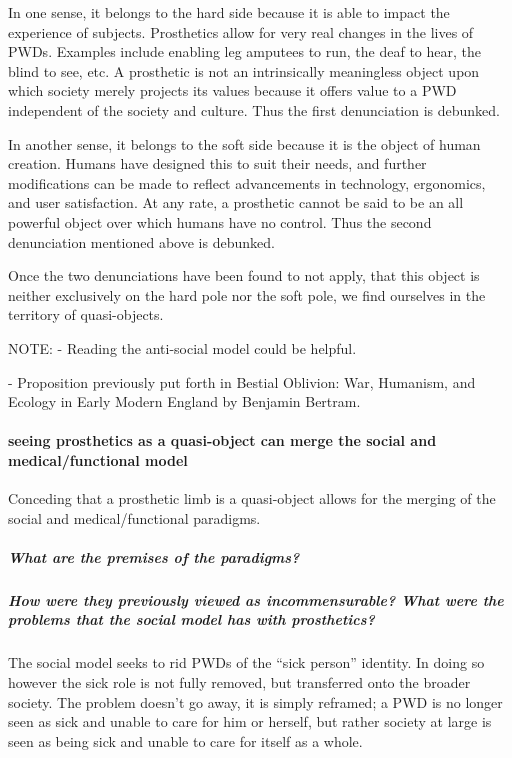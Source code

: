 \documentclass{lps}
\begin{document}
In one sense, it belongs to the hard side because it is able to impact the
experience of subjects. Prosthetics allow for very real changes in the lives
of PWDs. Examples include enabling leg amputees to run, the deaf to hear, the
blind to see, etc. A prosthetic is not an intrinsically meaningless object
upon which society merely projects its values because it offers value to a PWD
independent of the society and culture. Thus the first denunciation is
debunked.

In another sense, it belongs to the soft side because it is the object of
human creation. Humans have designed this to suit their needs, and further
modifications can be made to reflect advancements in technology, ergonomics,
and user satisfaction. At any rate, a prosthetic cannot be said to be an all
powerful object over which humans have no control. Thus the second
denunciation mentioned above is debunked.

Once the two denunciations have been found to not apply, that this object is
neither exclusively on the hard pole nor the soft pole,  we find ourselves in
the territory of quasi-objects.


NOTE:
- Reading the anti-social model could be helpful.

- Proposition previously put forth in Bestial Oblivion: War, Humanism, and
Ecology in Early Modern England by Benjamin Bertram.

\paragraph{seeing prosthetics as a quasi-object can merge the social and
medical/functional model}

Conceding that a prosthetic limb is a quasi-object allows for the merging of
the social and medical/functional paradigms. 

\subparagraph{What are the premises of the paradigms?}

\subparagraph{How were they previously viewed as incommensurable? What were
the problems that the social model has with prosthetics?}

The social model seeks to rid PWDs of the ``sick person'' identity. In doing so
however the sick role is not fully removed, but transferred onto the broader
society. The problem doesn’t go away, it is simply reframed; a PWD is no
longer seen as sick and unable to care for him or herself, but rather society
at large is seen as being sick and unable to care for itself as a whole.
\end{document}
